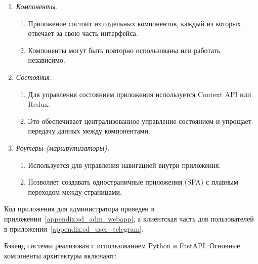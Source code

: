 \begin{enumerate}
    \item \textit{Компоненты.}
    \begin{enumerate}
        \item Приложение состоит из отдельных компонентов, каждый из которых отвечает за свою часть интерфейса.
        \item Компоненты могут быть повторно использованы или работать независимо.
    \end{enumerate}
    \item \textit{Состояния.}
    \begin{enumerate}
        \item Для управления состоянием приложения используется Context API или Redux.
        \item Это обеспечивает централизованное управление состоянием и упрощает передачу данных между компонентами.
    \end{enumerate}
    \item \textit{Роутеры (маршрутизаторы).}
    \begin{enumerate}
        \item Используется для управления навигацией внутри приложения.
        \item Позволяет создавать одностраничные приложения (SPA) с плавным переходом между страницами.
    \end{enumerate}
\end{enumerate}

Код приложения для администратора приведен в приложении~\ref{appendix:sd_adm_webapp}, а клиентская часть для пользователей в приложении~\ref{appendix:sd_user_telegram}.

Бэкенд системы реализован с использованием Python и FastAPI. Основные компоненты архитектуры включают:

